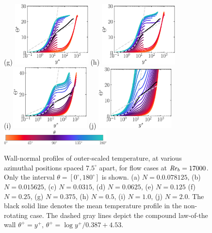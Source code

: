 \documentclass[lineno]{jfm}
\begin{document}
\begin{figure}
                (g) \includegraphics[width=4cm]{Figures/prof_ttstar_rotz0_roty0.1875.eps}
                (h) \includegraphics[width=4cm]{Figures/prof_ttstar_rotz0_roty0.25.eps} \\
                (i) \includegraphics[width=4cm]{Figures/prof_ttstar_rotz0_roty0.5.eps}
                (j) \includegraphics[width=4cm]{Figures/prof_ttstar_rotz0_roty1.0.eps} \\
                \includegraphics[width=0.5\textwidth]{Figures/theta_cmap.eps}
        \caption{
                Wall-normal profiles of
                outer-scaled temperature,
                at various azimuthal positions spaced
                $7.5^\circ$ apart,
                for flow cases at $\mbox{\textit{Re}}_b=17000$.
                Only the interval $\theta = [0^{\circ},180^{\circ}]$ is shown.
                (a) $N = 0.0.078125$,
                (b) $N = 0.015625$,
                (c) $N = 0.0315$,
                (d) $N = 0.0625$,
                (e) $N = 0.125$
                (f) $N = 0.25$,
                (g) $N = 0.375$,
                (h) $N = 0.5$,
                (i) $N = 1.0$,
                (j) $N = 2.0$.
                The black solid line denotes the mean temperature profile in the
                non-rotating case.
                The dashed gray lines depict the compound law-of-the wall
		$\theta^{+}=y^+$, $\theta^{+}=\log y^+/0.387 + 4.53$.
        }
                \label{fig:tstar}
        \end{figure}
\end{document}
